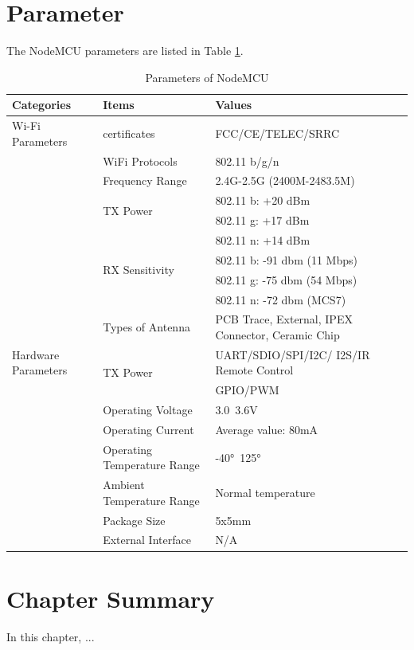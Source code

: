 \section{Parameter}
The NodeMCU parameters are listed in Table \ref{table2}.

\begin{table}
\caption{Parameters of NodeMCU}
\label{table2}
\centering
\begin{tabular}{|l|p{3.7cm}|p{4.8cm}|}
\hline 
\textbf{Categories} & \textbf{Items} & \textbf{Values} \tabularnewline
\hline 
\multirow{1}{*}{Wi-Fi Parameters} & certificates & FCC/CE/TELEC/SRRC \\\cline{2-3}
                 & WiFi Protocols & 802.11 b/g/n \\\cline{2-3}
                 & Frequency Range	 & 2.4G-2.5G (2400M-2483.5M) \\\cline{2-3}
                 & \multirow{2}{*}{TX Power} & 802.11 b: +20 dBm \\\cline{3-3}
                 & & 802.11 g: +17 dBm \\ \cline{3-3}
                 & & 802.11 n: +14 dBm \\ \cline{2-3}
                 & \multirow{2}{*}{RX Sensitivity} & 802.11 b: -91 dbm (11 Mbps)   \\\cline{3-3}
                 & & 802.11 g: -75 dbm (54 Mbps)  \\ \cline{3-3}
                 & & 802.11 n: -72 dbm (MCS7) \\ \cline{2-3}
                   & Types of Antenna & PCB Trace, External, IPEX Connector, Ceramic Chip    \\ \cline{1-3}
                 
\multirow{1}{*}{Hardware Parameters} & \multirow{2}{*}{TX Power} & UART/SDIO/SPI/I2C/ \newline I2S/IR Remote Control \\\cline{3-3}
                 &  & GPIO/PWM\\\cline{2-3}                
                 & Operating Voltage & 3.0~3.6V \\ \cline{2-3}
                 & Operating Current & Average value: 80mA \\ \cline{2-3}
                 & Operating Temperature Range& -40°~125° \\ \cline{2-3}
                 & Ambient Temperature Range & Normal temperature  \\\cline{2-3}
                 & Package Size & 5x5mm  \\ \cline{2-3}
                 & External Interface & N/A \\ \cline{1-3} \hline 
\end{tabular}
\end{table}

\section{Chapter Summary}
In this chapter, ...













